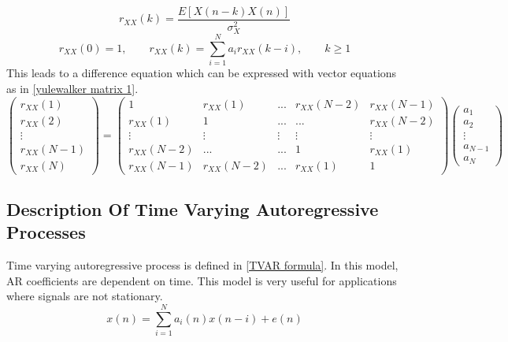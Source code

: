 \documentclass[a4paper,onesided,12pt]{report}
\begin{document}
\begin{equation}\label{Autocorrelation}
r_{XX}(k) = \frac{E[X(n-k)X(n)]}{\sigma_X^2}
\end{equation}
\begin{equation}\label{YuleWalker 1}
r_{XX}(0) = 1,\qquad 
r_{XX}(k) = \sum_{i=1}^{N}{a_ir_{XX}(k-i)}, \qquad k \geq 1
\end{equation}
This leads to a difference equation which can be expressed with vector equations as in \ref{yulewalker matrix 1}.
\begin{equation}\label{yulewalker matrix 1}
\begin{pmatrix}
r_{XX}(1) \\ 
r_{XX}(2) \\ 
\vdots \\ 
r_{XX}(N-1)\\ 
r_{XX}(N) 
\end{pmatrix} =  
\begin{pmatrix}
1 & r_{XX}(1) & ... & r_{XX}(N-2) & r_{XX}(N-1) \\
r_{XX}(1) & 1 & ... & ... & r_{XX}(N-2) \\
\vdots    & \vdots    & \vdots & \vdots & \vdots \\
r_{XX}(N-2) & ... & ... & 1 & r_{XX}(1) \\
r_{XX}(N-1) & r_{XX}(N-2) & ... & r_{XX}(1) & 1
\end{pmatrix} 
\begin{pmatrix} 
a_{1} \\ 
a_{2} \\
\vdots \\
a_{N-1} \\
a_{N} \end{pmatrix}
\end{equation}
\subsection{Description Of Time Varying Autoregressive Processes}
Time varying autoregressive process is defined in \ref{TVAR formula}. In this model, AR coefficients are dependent on time. This model is very useful for applications where signals are not stationary. 
\begin{equation}\label{TVAR formula}
x(n) = \sum_{i=1}^{N}{a_i(n)x(n-i)} + e(n) 
\end{equation}
\end{document}
